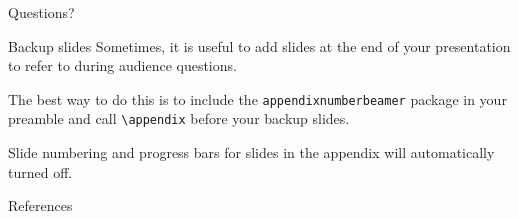 \documentclass[aspectratio=169,usenames,dvipsnames,pdftex]{beamer}
\begin{document}
	\begin{frame}[standout]
		Questions?
	\end{frame}

	\appendix

	\begin{frame}[fragile]{Backup slides}
		Sometimes, it is useful to add slides at the end of your presentation to
		refer to during audience questions.

		The best way to do this is to include the \verb|appendixnumberbeamer|
		package in your preamble and call \verb|\appendix| before your backup slides.

		Slide numbering and progress bars for slides in the appendix will automatically turned off.
	\end{frame}

	\begin{frame}[allowframebreaks]{References}
		
		
	\end{frame}
\end{document}
